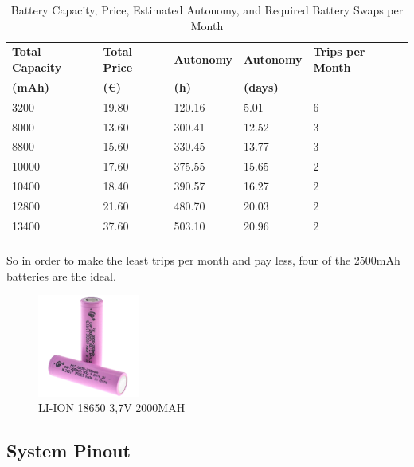 \begin{table}[H]
    \centering
    \small
    \setlength{\tabcolsep}{6pt}
    \begin{tabular}{l|l|l|l|l}
        \textbf{Total Ca\-pa\-ci\-ty} & \textbf{Total Price} & \textbf{Au\-to\-no\-my} & \textbf{Au\-to\-no\-my} & \textbf{Trips per Month} \\
        \textbf{(mAh)} & \textbf{(€)} & \textbf{(h)} & \textbf{(days)} & \\
        \hline
        \arrayrulecolor[gray]{0.85}
        3200  & 19.80 & 120.16 & 5.01  & 6 \\
        \hline
        8000  & 13.60 & 300.41 & 12.52 & 3 \\
        \hline
        8800  & 15.60 & 330.45 & 13.77 & 3 \\
        \hline
        10000 & 17.60 & 375.55 & 15.65 & 2 \\
        \hline
        10400 & 18.40 & 390.57 & 16.27 & 2 \\
        \hline
        12800 & 21.60 & 480.70 & 20.03 & 2 \\
        \hline
        13400 & 37.60 & 503.10 & 20.96 & 2 \\
        \arrayrulecolor{black}
    \end{tabular}
    \caption{Battery Capacity, Price, Estimated Autonomy, and Required Battery Swaps per Month}
    \label{table:battery_autonomy_trips}
\end{table}

So in order to make the least trips per month and pay less, four of the 2500mAh batteries are the ideal. 



\begin{figure}[H]
    \centering
    \includegraphics[width=0.3\textwidth]{images/chapter/design/components/batt.jpg}  %
    \caption{LI-ION 18650 3,7V 2000MAH}
    \label{fig:Battery}        
\end{figure}

\subsection{System Pinout}

